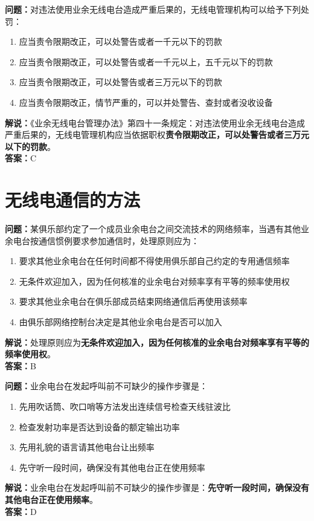 \documentclass{ctexbook}
\begin{document}
\bigskip


\noindent\textbf{问题：}对违法使用业余无线电台造成严重后果的，无线电管理机构可以给予下列处罚：
\begin{enumerate}[label=\Alph*), leftmargin=3em]
	\item 应当责令限期改正，可以处警告或者一千元以下的罚款
	\item 应当责令限期改正，可以处警告或者一千元以上，五千元以下的罚款
	\item 应当责令限期改正，可以处警告或者三万元以下的罚款
	\item 应当责令限期改正，情节严重的，可以并处警告、查封或者没收设备
\end{enumerate}
\noindent\textbf{解说：}《业余无线电台管理办法》第四十一条规定：对违法使用业余无线电台造成严重后果的，无线电管理机构应当依据职权\textbf{责令限期改正，可以处警告或者三万元以下的罚款}。\\\textbf{答案：}C











\chapter{无线电通信的方法}



\noindent\textbf{问题：}某俱乐部约定了一个成员业余电台之间交流技术的网络频率，当遇有其他业余电台按通信惯例要求参加通信时，处理原则应为：
\begin{enumerate}[label=\Alph*), leftmargin=3em]
	\item 要求其他业余电台在任何时间都不得使用俱乐部自己约定的专用通信频率
	\item 无条件欢迎加入，因为任何核准的业余电台对频率享有平等的频率使用权
	\item 要求其他业余电台在俱乐部成员结束网络通信后再使用该频率
	\item 由俱乐部网络控制台决定是其他业余电台是否可以加入
\end{enumerate}
\noindent\textbf{解说：}处理原则应为\textbf{无条件欢迎加入，因为任何核准的业余电台对频率享有平等的频率使用权}。\\\noindent\textbf{答案：}B

\bigskip


\noindent\textbf{问题：}业余电台在发起呼叫前不可缺少的操作步骤是：
\begin{enumerate}[label=\Alph*), leftmargin=3em]
	\item 先用吹话筒、吹口哨等方法发出连续信号检查天线驻波比
	\item 检查发射功率是否达到设备的额定输出功率
	\item 先用礼貌的语言请其他电台让出频率
	\item 先守听一段时间，确保没有其他电台正在使用频率
\end{enumerate}
\noindent\textbf{解说：}业余电台在发起呼叫前不可缺少的操作步骤是：\textbf{先守听一段时间，确保没有其他电台正在使用频率}。\\\noindent\textbf{答案：}D%
\end{document}
